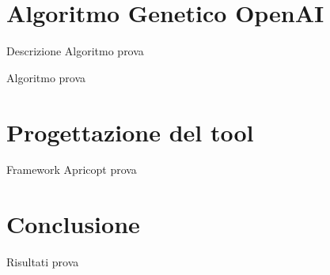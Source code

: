 \documentclass{beamer}
\begin{document}
\section{Algoritmo Genetico OpenAI}

\begin{frame}[fragile]{Descrizione Algoritmo}
prova
\end{frame}

\begin{frame}[fragile]{Algoritmo}
prova
\end{frame}

\section{Progettazione del tool}

\begin{frame}[fragile]{Framework Apricopt}
prova
\end{frame}

\section{Conclusione}

\begin{frame}[fragile]{Risultati}
prova
\end{frame}


\backmatter
\end{document}

